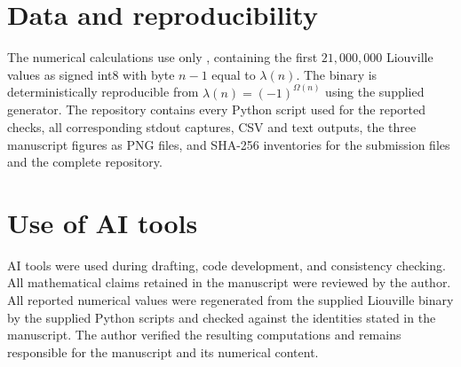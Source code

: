 \documentclass[preprint,12pt]{elsarticle}
\numberwithin{equation}{section}
\theoremstyle{plain}
\theoremstyle{definition}
\theoremstyle{remark}
\begin{document}
\section{Data and reproducibility}
\label{sec:data}

The numerical calculations use only
, containing the first $21{,}000{,}000$
Liouville values as signed int8 with byte $n-1$ equal to $\lambda(n)$. The
binary is deterministically reproducible from
$\lambda(n)=(-1)^{\Omega(n)}$ using the supplied generator. The repository
contains every Python script used for the reported checks, all corresponding
stdout captures, CSV and text outputs, the three manuscript figures as PNG
files, and SHA-256 inventories for the submission files and the complete
repository.

\section{Use of AI tools}
\label{sec:ai}

AI tools were used during drafting, code development, and consistency
checking. All mathematical claims retained in the manuscript were reviewed by
the author. All reported numerical values were regenerated from the supplied
Liouville binary by the supplied Python scripts and checked against the
identities stated in the manuscript. The author verified the resulting
computations and remains responsible for the manuscript and its numerical
content.
\end{document}
